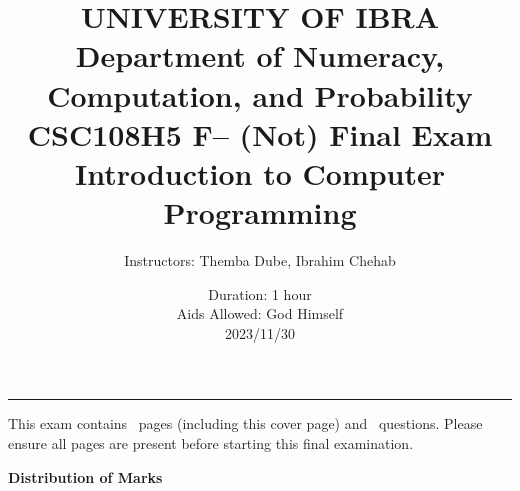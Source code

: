 \documentclass[letterpaper,12pt,addpoints]{exam}
\newcommand{\university}{UNIVERSITY OF IBRA}
\newcommand{\faculty}{Department of Numeracy, Computation, and Probability}
\newcommand{\class}{CSC108H5 F}
\newcommand{\examnum}{(Not) Final Exam}
\newcommand{\content}{Introduction to Computer Programming}
\newcommand{\examdate}{2023/11/30}
\begin{document}
\title{\Large \textbf{\university\\ \faculty\\
\bigskip
\class -- \examnum \\ \content}}
\author{Instructors: Themba Dube, Ibrahim Chehab}
\date{Duration: 1 hour\\ Aids Allowed: God Himself\\ \examdate}
\maketitle
\begin{flushleft}
\medskip
{}
\end{flushleft}
\noindent \rule{\textwidth}{1pt}

\noindent This exam contains \numpages\ pages (including this cover page) and \numquestions\ questions. Please ensure all pages are present before starting this final examination. 

\begin{center}
\textbf{Distribution of Marks}\\
\medskip
\gradetable[v][questions]
\end{center}

\clearpage
\end{document}

